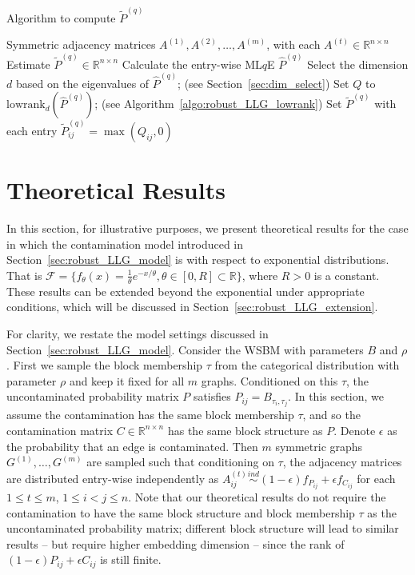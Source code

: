 \begin{algorithm}[H]
\caption{Algorithm to compute $\widetilde{P}^{(q)}$}
\label{algo:robust_LLG_basic_q}
\begin{algorithmic}[1]
\REQUIRE Symmetric adjacency matrices $A^{(1)}, A^{(2)}, \dotsc, A^{(m)}$, with each $A^{(t)} \in \mathbb{R}^{n \times n}$
\ENSURE Estimate $\widetilde{P}^{(q)} \in \mathbb{R}^{n \times n}$
\STATE Calculate the entry-wise ML$q$E $\hat{P}^{(q)}$
\STATE Select the dimension $d$ based on the eigenvalues of $\hat{P}^{(q)}$; (see Section~\ref{sec:dim_select})
\STATE Set $Q$ to $\mathrm{lowrank}_d(\hat{P}^{(q)})$; (see Algorithm~\ref{algo:robust_LLG_lowrank})
\STATE Set $\widetilde{P}^{(q)}$ with each entry $\widetilde{P}^{(q)}_{ij} = \max(Q_{ij}, 0)$
\end{algorithmic}
\end{algorithm}










\section{Theoretical Results}
\label{sec:robust_LLG_theoretical_result}

In this section, for illustrative purposes, we present theoretical results for the case in which the contamination model introduced in Section~\ref{sec:robust_LLG_model} is with respect to exponential distributions. That is $\mathcal{F} = \{ f_{\theta}(x) = \frac{1}{\theta} e^{-x/\theta}, \theta \in [0, R] \subset \mathbb{R} \}$, where $R > 0$ is a constant. These results can be extended beyond the exponential under appropriate conditions, which will be discussed in Section~\ref{sec:robust_LLG_extension}.

For clarity, we restate the model settings discussed in Section~\ref{sec:robust_LLG_model}. Consider the WSBM with parameters $B$ and $\rho$. First we sample the block membership $\tau$ from the categorical distribution with parameter $\rho$ and keep it fixed for all $m$ graphs. Conditioned on this $\tau$, the uncontaminated probability matrix $P$  satisfies $P_{ij} = B_{\tau_i, \tau_j}$. In this section, we assume the contamination has the same block membership $\tau$, and so the contamination matrix $C \in \mathbb{R}^{n \times n}$ has the same block structure as $P$.  Denote $\epsilon$ as the probability that an edge is contaminated. Then $m$ symmetric graphs $G^{(1)}, \dotsc, G^{(m)}$  are sampled such that conditioning on $\tau$, the adjacency matrices are distributed entry-wise independently as $A^{(t)}_{ij} \stackrel{ind}{\sim} (1-\epsilon) f_{P_{ij}} + \epsilon f_{C_{ij}}$ for each $1 \le t \le m$, $1 \le i < j \le n$. 
Note that our theoretical results do not require the contamination to have the same block structure and block membership $\tau$ as the uncontaminated probability matrix; different block structure will lead to similar results -- but require higher embedding dimension -- since the rank of $(1-\epsilon) P_{ij} + \epsilon C_{ij}$ is still finite.

